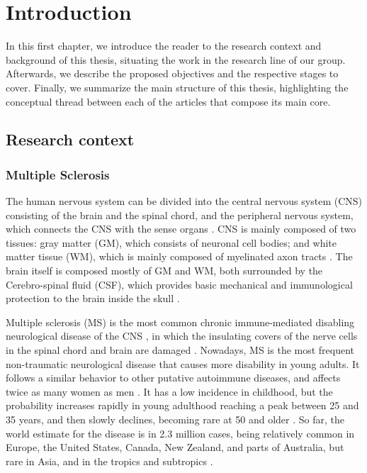 \chapter{Introduction}


In this first chapter, we introduce the reader to the research context and background of this thesis, situating the work in the research line of our group. Afterwards, we describe the proposed objectives and the respective stages to cover. Finally, we summarize the main structure of this thesis, highlighting the conceptual thread between each of the articles that compose its main core. 

\section{Research context}
\label{sec:introduction_research_context}

\subsection{Multiple Sclerosis}
\label{sub:introduction_multiple_sclerosis}

The human nervous system can be divided into the central nervous system (CNS) consisting of the brain and the spinal chord, and the peripheral nervous system, which connects the CNS with the sense organs \cite{Brodal2010}. CNS is mainly composed of two tissues: gray matter (GM), which consists of neuronal cell bodies; and white matter tissue (WM), which is mainly composed of myelinated axon tracts \cite{Sperber2006}. The brain itself is composed mostly of GM and WM, both surrounded by the Cerebro-spinal fluid (CSF), which provides basic mechanical and immunological protection to the brain inside the skull \cite{Sperber2006}. 

Multiple sclerosis (MS) is the most common chronic immune-mediated disabling neurological disease of the CNS \cite{Steinman1996}, in which the insulating covers of the nerve cells in the spinal chord and brain are damaged \cite{Compston2008}. Nowadays, MS is the most frequent non-traumatic neurological disease that causes more disability in young adults. It follows a similar behavior to other putative autoimmune diseases, and affects twice as many women as men \cite{Confavreux1980}. It has a low incidence in childhood, but the probability increases rapidly in young adulthood reaching a peak between 25 and 35 years, and then slowly declines, becoming rare at 50 and older \cite{MSIF2013}. So far, the world estimate for the disease is in 2.3 million cases, being relatively common in Europe, the United States, Canada, New Zealand, and parts of Australia, but rare in Asia, and in the tropics and subtropics \cite{MSIF2013}. 

